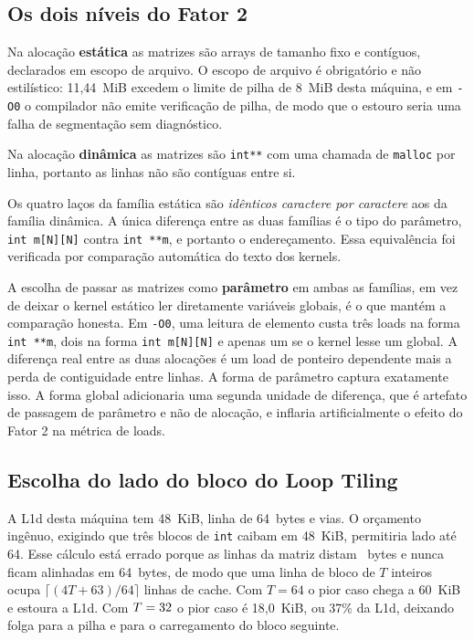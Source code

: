\documentclass[11pt,a4paper]{article}
\begin{document}
\subsection{Os dois níveis do Fator 2}

Na alocação \textbf{estática} as matrizes são arrays de tamanho fixo e contíguos,
declarados em escopo de arquivo. O escopo de arquivo é obrigatório e não estilístico:
11,44~MiB excedem o limite de pilha de 8~MiB desta máquina, e em \texttt{-O0} o
compilador não emite verificação de pilha, de modo que o estouro seria uma falha de
segmentação sem diagnóstico.

Na alocação \textbf{dinâmica} as matrizes são \texttt{int**} com uma chamada de
\texttt{malloc} por linha, portanto as linhas não são contíguas entre si.

Os quatro laços da família estática são \emph{idênticos caractere por caractere} aos da
família dinâmica. A única diferença entre as duas famílias é o tipo do parâmetro,
\texttt{int m[N][N]} contra \texttt{int **m}, e portanto o endereçamento. Essa
equivalência foi verificada por comparação automática do texto dos kernels.

A escolha de passar as matrizes como \textbf{parâmetro} em ambas as famílias, em vez de
deixar o kernel estático ler diretamente variáveis globais, é o que mantém a comparação
honesta. Em \texttt{-O0}, uma leitura de elemento custa três loads na forma
\texttt{int **m}, dois na forma \texttt{int m[N][N]} e apenas um se o kernel lesse um
global. A diferença real entre as duas alocações é um load de ponteiro dependente mais a
perda de contiguidade entre linhas. A forma de parâmetro captura exatamente isso. A
forma global adicionaria uma segunda unidade de diferença, que é artefato de passagem de
parâmetro e não de alocação, e inflaria artificialmente o efeito do Fator 2 na métrica
de loads.

\subsection{Escolha do lado do bloco do Loop Tiling}
\label{sec:bloco}

A L1d desta máquina tem 48~KiB, linha de 64~bytes e \valAssociatividade{} vias. O
orçamento ingênuo, exigindo que três blocos de \texttt{int} caibam em 48~KiB, permitiria
lado até 64. Esse cálculo está errado porque as linhas da matriz distam
\valStrideLinha~bytes e nunca ficam alinhadas em 64~bytes, de modo que uma linha de
bloco de $T$ inteiros ocupa $\lceil (4T+63)/64 \rceil$ linhas de cache. Com $T = 64$ o
pior caso chega a 60~KiB e estoura a L1d. Com $T = 32$ o pior caso é 18,0~KiB, ou
37\% da L1d, deixando folga para a pilha e para o carregamento do bloco seguinte.
\end{document}
